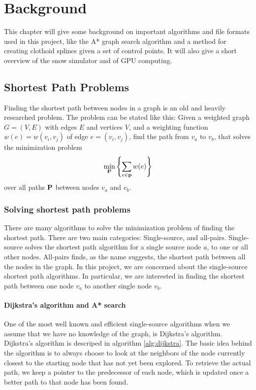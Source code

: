 \chapter{Background}
\label{chap:background}
This chapter will give some background on important algorithms and file formats used in this project, like the A* graph search algorithm and a method for creating clothoid splines given a set of control points. It will also give a short overview of the snow simulator and of GPU computing.

\section{Shortest Path Problems}
Finding the shortest path between nodes in a graph is an old and heavily researched problem. The problem can be stated like this: Given a weighted graph $G = (V,E)$ with edges $E$ and vertices $V$, and a weighting function $w(e) = w(v_i, v_j)$ of edge $e = (v_i, v_j)$, find the path from $v_a$ to $v_b$, that solves the minimization problem
\begin{equation}
\min_{\mathbf P} \left\{ \sum_{e\in \mathbf{p}} w(e) \right\}
\end{equation}
over all paths $\mathbf P$ between nodes $v_a$ and $v_b$.\cite{shortestpath}

\subsection{Solving shortest path problems}
\label{sec:solving_shortest_path}
There are many algorithms to solve the minimization problem of finding the shortest path. There are two main categories: Single-source, and all-pairs. Single-source solves the shortest path algorithm for a single source node $a$, to one or all other nodes. All-pairs finds, as the name suggests, the shortest path between all the nodes in the graph. In this project, we are concerned about the single-source shortest path algorithms. In particular, we are interested in finding the shortest path between one node $v_a$ to another single node $v_b$.

\subsubsection{Dijkstra's algorithm and A* search}
One of the most well known and efficient single-source algorithms when we assume that we have no knowledge of the graph, is Dijkstra's algorithm. Dijkstra's algorithm is descriped in algorithm \ref{alg:dijkstra}. The basic idea behind the algorithm is to always choose to look at the neighbors of the node currently closest to the starting node that has not yet been explored. To retrieve the actual path, we keep a pointer to the predecessor of each node, which is updated once a better path to that node has been found. 

